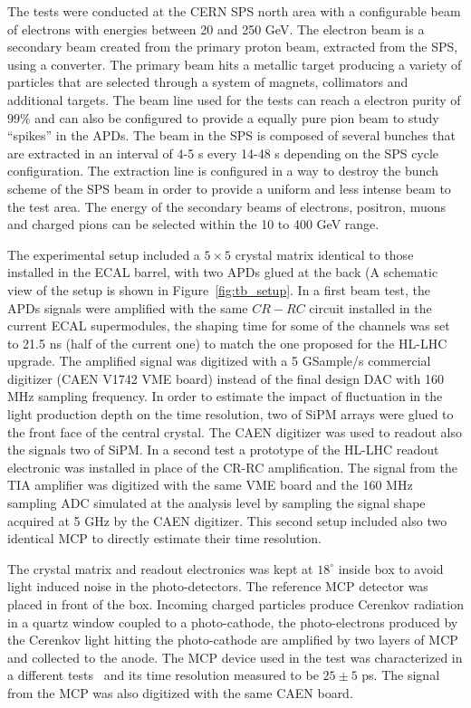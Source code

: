 The tests were conducted at the CERN SPS north area with a configurable beam of electrons with energies between 20 and 250 GeV.
The electron beam is a secondary beam created from the primary proton beam, extracted from the SPS, using a converter.
The primary beam hits a metallic target producing a variety of particles that are selected through a system of magnets, collimators
and additional targets. The beam line used for the tests can reach a electron purity of $99\%$ and can also be
configured to provide a equally pure pion beam to study ``spikes'' in the APDs.
The beam in the SPS is composed of several bunches that are extracted in an interval of 4-5 s every 14-48 s depending on the
SPS cycle configuration. The extraction line is configured in a way to destroy the bunch scheme of the SPS beam in order
to provide a uniform and less intense beam to the test area.
The energy of the secondary beams of electrons, positron, muons and charged pions can be selected within the 10 to 400 GeV
range. 

The experimental setup included a $5\times 5$ \PbWO crystal matrix identical to those installed in the ECAL barrel,
with two APDs glued at the back (A schematic view of the setup is shown in Figure~\ref{fig:tb_setup}.
In a first beam test, the APDs signals were amplified with the same $CR-RC$ circuit installed in the current ECAL
supermodules, the shaping time for some of the channels was set to 21.5 ns (half of the current one) to match the
one proposed for the HL-LHC upgrade.
The amplified signal was digitized with a 5 GSample/s commercial digitizer (CAEN V1742 VME board)
instead of the final design DAC with 160 MHz sampling frequency.
In order to estimate the impact of fluctuation in the light production depth on the time resolution,
two of SiPM arrays were glued to the front face of the central crystal.
The CAEN digitizer was used to readout also the signals two of SiPM.
In a second test a prototype of the HL-LHC readout electronic was installed in place of the
CR-RC amplification. The signal from the TIA amplifier was digitized with the same VME board and the
160 MHz sampling ADC simulated at the analysis level by sampling the signal shape acquired at 5 GHz by the CAEN digitizer.
This second setup included also two identical MCP to directly estimate their time resolution.

The crystal matrix and readout electronics was kept at $18^{\circ}$ inside box to avoid
light induced noise in the photo-detectors. The reference MCP detector was placed in front of the box. 
Incoming charged particles produce Cerenkov radiation in a quartz window coupled to a photo-cathode,
the photo-electrons produced by the Cerenkov light hitting
the photo-cathode are amplified by two layers of MCP and collected to the anode. 
The MCP device used in the test was characterized 
in a different tests~\cite{mcp1,mcp2} and its time resolution measured to be $25\pm5$ ps.
The signal from the MCP was also digitized with the same CAEN board.

